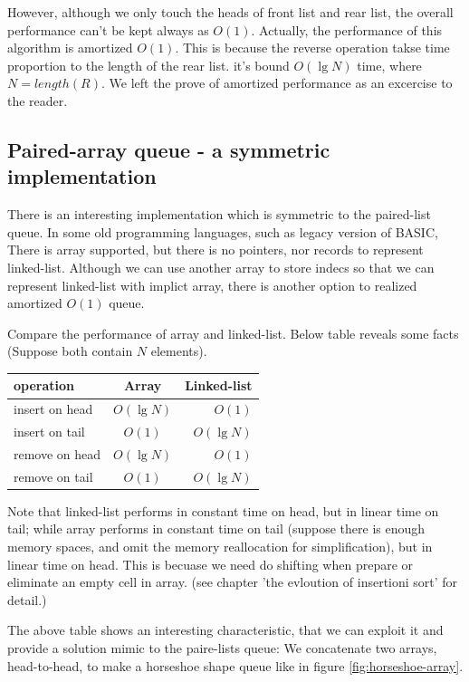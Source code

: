 \documentclass{article}
\begin{document}
However, although we only touch the heads of front list and rear list, the 
overall performance can't be kept always as $O(1)$. Actually, the performance
of this algorithm is amortized $O(1)$. This is because the reverse operation
takse time proportion to the length of the rear list. it's bound $O(\lg N)$
time, where $N = length(R)$. We left the prove of amortized performance as 
an excercise to the reader.

\subsection{Paired-array queue - a symmetric implementation}

There is an interesting implementation which is symmetric to the paired-list
queue. In some old programming languages, such as legacy version of BASIC,
There is array supported, but there is no pointers, nor records to represent
linked-list. Although we can use another array to store indecs so that we
can represent linked-list with implict array, there is another option to
realized amortized $O(1)$ queue.

Compare the performance of array and linked-list. Below table reveals some
facts (Suppose both contain $N$ elements).

\begin{tabular}{l | c | r}
  \hline
  operation & Array & Linked-list \\
  \hline
  insert on head & $O(\lg N)$ & $O(1)$ \\
  insert on tail & $O(1)$ & $O(\lg N)$ \\
  remove on head & $O(\lg N)$ & $O(1)$ \\
  remove on tail & $O(1)$ & $O(\lg N)$ \\
  \hline
\end{tabular}

Note that linked-list performs in constant time on head, but in linear time on tail;
while array performs in constant time on tail (suppose there is enough memory spaces, and
omit the memory reallocation for simplification), but in linear time on head.
This is becuase we need do shifting when prepare or eliminate an empty cell in array.
(see chapter 'the evloution of insertioni sort' for detail.)

The above table shows an interesting characteristic, that we can exploit it and provide
a solution mimic to the paire-lists queue: We concatenate two arrays, head-to-head, to
make a horseshoe shape queue like in figure \ref{fig:horseshoe-array}.
\end{document}
